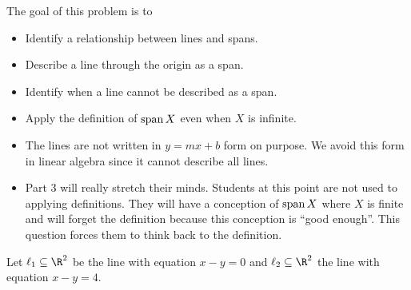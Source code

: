 	\bookonlynewpage
	\question
	\begin{annotation}
		\begin{goals}

			The goal of this problem is to
			\begin{itemize}
				\item Identify a relationship between lines and spans.
				\item Describe a line through the origin as a span.
				\item Identify when a line cannot be described as a span.
				\item Apply the definition of $\operatorname{span} X$ even when $X$ is infinite.
			\end{itemize}
		\end{goals}

		\begin{notes}
			\begin{itemize}
				\item The lines are not written in $y=mx+b$ form on purpose.
					We avoid this form in linear algebra since it cannot
					describe all lines.
				\item Part 3 will really stretch their minds. Students at this point are not used
					to applying definitions. They will have a conception of $\operatorname{span} X$
					where $X$ is finite and will forget the definition because
					this conception is ``good enough''. This question forces
					them to think back to the definition.
			\end{itemize}
		\end{notes}
	\end{annotation}
	\label{linesAsSpans}
	Let $\ell_1\subseteq \R^2$ be the line with equation $x-y=0$ and $\ell_2\subseteq\R^2$
	the line with equation $x-y=4$.
